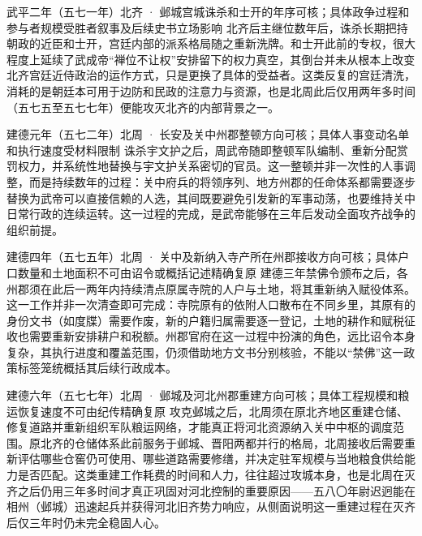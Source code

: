 \begin{event}{}{武平二年（五七一年）}{北齐 · 邺城宫城}{诛杀和士开的年序可核；具体政争过程和参与者规模受胜者叙事及后续史书立场影响}
北齐后主继位数年后，诛杀长期把持朝政的近臣和士开，宫廷内部的派系格局随之重新洗牌。和士开此前的专权，很大程度上延续了武成帝“禅位不让权”安排留下的权力真空，其倒台并未从根本上改变北齐宫廷近侍政治的运作方式，只是更换了具体的受益者。这类反复的宫廷清洗，消耗的是朝廷本可用于边防和民政的注意力与资源，也是北周此后仅用两年多时间（五七五至五七七年）便能攻灭北齐的内部背景之一。
\end{event}

\begin{event}{}{建德元年（五七二年）}{北周 · 长安及关中州郡}{整顿方向可核；具体人事变动名单和执行速度受材料限制}
诛杀宇文护之后，周武帝随即整顿军队编制、重新分配赏罚权力，并系统性地替换与宇文护关系密切的官员。这一整顿并非一次性的人事调整，而是持续数年的过程：关中府兵的将领序列、地方州郡的任命体系都需要逐步替换为武帝可以直接信赖的人选，其间既要避免引发新的军事动荡，也要维持关中日常行政的连续运转。这一过程的完成，是武帝能够在三年后发动全面攻齐战争的组织前提。
\end{event}

\begin{event}{}{建德四年（五七五年）}{北周 · 关中及新纳入寺产所在州郡}{接收方向可核；具体户口数量和土地面积不可由诏令或概括记述精确复原}
建德三年禁佛令颁布之后，各州郡须在此后一两年内持续清点原属寺院的人户与土地，将其重新纳入赋役体系。这一工作并非一次清查即可完成：寺院原有的依附人口散布在不同乡里，其原有的身份文书（如度牒）需要作废，新的户籍归属需要逐一登记，土地的耕作和赋税征收也需要重新安排耕户和税额。州郡官府在这一过程中扮演的角色，远比诏令本身复杂，其执行进度和覆盖范围，仍须借助地方文书分别核验，不能以“禁佛”这一政策标签笼统概括其后续行政成本。
\end{event}

\begin{event}{}{建德六年（五七七年）}{北周 · 邺城及河北州郡}{重建方向可核；具体工程规模和粮运恢复速度不可由纪传精确复原}
攻克邺城之后，北周须在原北齐地区重建仓储、修复道路并重新组织军队粮运网络，才能真正将河北资源纳入关中中枢的调度范围。原北齐的仓储体系此前服务于邺城、晋阳两都并行的格局，北周接收后需要重新评估哪些仓窖仍可使用、哪些道路需要修缮，并决定驻军规模与当地粮食供给能力是否匹配。这类重建工作耗费的时间和人力，往往超过攻城本身，也是北周在灭齐之后仍用三年多时间才真正巩固对河北控制的重要原因——五八〇年尉迟迥能在相州（邺城）迅速起兵并获得河北旧齐势力响应，从侧面说明这一重建过程在灭齐后仅三年时仍未完全稳固人心。
\end{event}

